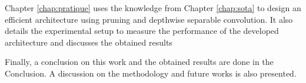 Chapter \ref{chap:pratique} uses the knowledge from Chapter \ref{chap:sota} to design an efficient architecture using pruning and depthwise separable convolution. It also details the experimental setup to measure the performance of the developed architecture and discusses the obtained results

Finally, a conclusion on this work and the obtained results are done in the Conclusion. A discussion on the methodology and future works is also presented.

\afterpage{\blankpage}
\cleardoublepage
\newpage
